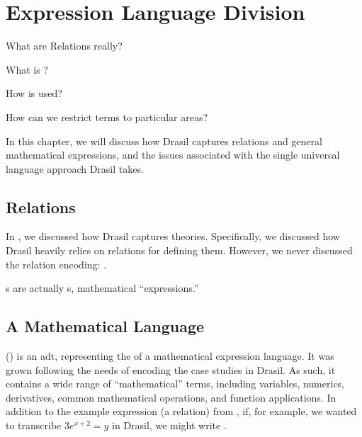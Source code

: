 \chapter{Expression Language Division}
\label{chap:lang-division}

\begin{writingdirectives}
    \item What are Relations really?
    \item What is \Expr{}?
    \item How is \Expr{} used?
    \item How can we restrict \Expr{} terms to particular areas?
\end{writingdirectives}

In this chapter, we will discuss how Drasil captures relations and general
mathematical expressions, and the issues associated with the single universal
language approach Drasil takes.

\section{Relations}
\label{chap:lang-division:sec:relations}

In , we discussed how Drasil captures theories.
Specifically, we discussed how Drasil heavily relies on relations for defining
them. However, we never discussed the relation encoding: \Relation{}.

\originalRelation{}

\Relation{}s are actually \Expr{}s, mathematical ``expressions.''

\originalExprHaskell{}

\section{A Mathematical Language}
\label{chap:lang-division:sec:a-mathematical-language}

\Expr{} () is an \acs{adt}, representing the 
of a mathematical expression language. It was grown following the needs of
encoding the case studies in Drasil. As such, it contains a wide range of
``mathematical'' terms, including variables, numerics, derivatives, common
mathematical operations, and function applications. In addition to the example
expression (a relation) from , if, for
example, we wanted to transcribe \(3 e^{x + 2} = y\) in Drasil, we might write
.

